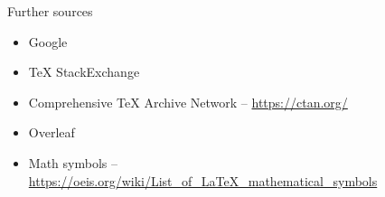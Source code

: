 \begin{frame}{Further sources}
	\begin{itemize}
		\item Google
		\item TeX StackExchange
		\item Comprehensive TeX Archive Network -- \url{https://ctan.org/}
		\item Overleaf
		\item Math symbols -- \url{https://oeis.org/wiki/List_of_LaTeX_mathematical_symbols}
	\end{itemize}
\end{frame}